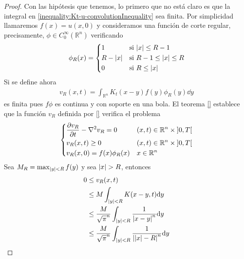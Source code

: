 \documentclass{article}
\newcommand{\realNumbers}{\mathbb{R}}
\theoremstyle{definition}
\theoremstyle{remark}
\newcommand{\leftOpenInterval}{\left]}
\newcommand{\rightOpenInterval}{\right[}
\newcommand{\leftClosedInterval}{\left[}
\newcommand{\rightClosedInterval}{\right]}
\newcommand{\interval}[3]{%
  \ifstrequal{#1}{oo}{%
    \leftOpenInterval #2, #3 \rightOpenInterval%
  }{%
    \ifstrequal{#1}{co}{%
      \leftClosedInterval #2, #3 \rightOpenInterval%
    }{%
      \ifstrequal{#1}{oc}{
        \leftOpenInterval #2, #3 \rightClosedInterval%
      }{%
        \ifstrequal{#1}{cc}{
          \leftClosedInterval #2, #3 \rightClosedInterval
        }{%
        }%
      }%
    }%
  }%
}
\begin{document}
  \begin{proof}
    Con las hipótesis que tenemos, lo primero que no está claro es que la integral en \ref{inequality:Kt-u-convolutionInequality} sea finita.
    Por simplicidad llamaremos \(f(x) = u(x, 0)\) y consideramos una función de corte regular, precisamente, \(\phi \in C^{\infty}_0(\realNumbers^n)\) verificando
    \begin{align}
      \phi_R(x)
      =
      \left\{
        \begin{aligned}
          & 1
            && \text{si } \abs{x} \leq R - 1
          \\
          & R - \abs{x}
            && \text{si } R - 1 \leq \abs{x} \leq R
          \\
          & 0
            && \text{si } R \leq \abs{x}
        \end{aligned}
      \right.
    \end{align}
    Si se define ahora
    \begin{align}
      v_R(x, t)
      =
      \int_{\realNumbers^n} K_t(x - y) f(y) \phi_R(y) \dd y
    \end{align}
    es finita pues \(f \phi\) es continua y con soporte en una bola.
    El teorema \ref{}  %
    establece que la función \(v_R\) definida por \ref{}  %
    verifica el problema
    \begin{align}
      \left\{
        \begin{aligned}
          & \frac{\partial v_R}{\partial t} - \laplacian v_R = 0
            && (x, t) \in \realNumbers^n \times \interval{oo}{0}{T}
          \\
          & v_R(x, t) \geq 0
            && (x, t) \in \realNumbers^n \times \interval{oo}{0}{T}
          \\
          & v_R(x, 0) = f(x)\phi_R(x)
            && x \in \realNumbers^n
        \end{aligned}
      \right.
    \end{align}
    Sea \(M_R = \max_{\abs{y} < R} f(y)\) y sea \(\abs{x} > R\), entonces
    \begin{align}
      0
      &\leq
      v_R(x, t)
      \\
      &\leq
      M \int_{\abs{y} < R} K(x - y, t) \dd y
      \\
      &\leq
      \frac{M}{\sqrt{\pi}^n} \int_{\abs{y} < R} \frac{1}{\abs{x - y}^n} \dd y
      \\
      &\leq
      \frac{M}{\sqrt{\pi}^n} \int_{\abs{y} < R} \frac{1}{\abs{\abs{x} - R}^n} \dd y
      \\

\end{align}
\end{proof}
\end{document}
